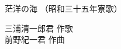 \documentclass[10pt,b5j]{tarticle} %
\begin{document}
\begin{minipage}[c]{0.7\hsize} %
    \begin{center}
        {\LARGE
            茫洋の海 %
        }
        {\small 
            （昭和三十五年寮歌） %
        }
    \end{center}
\end{minipage}
\begin{minipage}[c]{0.3\hsize} %
    \begin{flushright} %
        三浦清一郎君 作歌\\前野紀一君 作曲 %
    \end{flushright}
\end{minipage}
\end{document}
